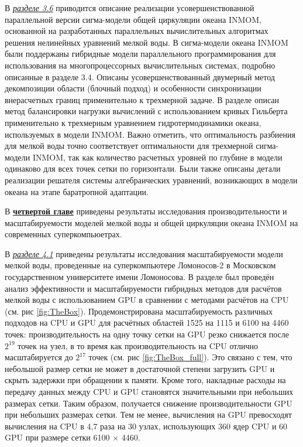 В \underline{\textit{разделе 3.6}} приводится описание реализации усовершенствованной параллельной версии сигма-модели общей циркуляции океана INMOM, основанной на разработанных параллельных вычислительных алгоритмах решения нелинейных уравнений мелкой воды.
В сигма-модели океана INMOM были поддержаны гибридные модели параллельного программирования для использования на многопроцессорных вычислительных системах, подробно описанные в разделе 3.4.
Описаны усовершенствованный двумерный метод декомпозиции области (блочный подход) и особенности синхронизации внерасчетных границ применительно к трехмерной задаче.
В разделе описан метод баланси­ровки нагрузки вычислений с использованием кривых Гильберта применительно к трехмерным уравнением гидротермодинамики океана, используемых в модели INMOM.
Важно отметить, что оптимальность разбиения для мелкой воды точно соответствует оптимальности для трехмерной сигма-модели INMOM, так как количество расчетных уровней по глубине в модели одинаково для всех точек сетки по горизонтали.
Были также описаны детали реализации решателя системы алгебраических уравнений, возникающих в модели океана на этапе баратропной адаптации.

В \underline{\textbf{четвертой главе}} приведены результаты исследования производительности и масштабируемости моделей мелкой воды и общей циркуляции океана INMOM на современных суперкомпьюетрах.

В \underline{\textit{разделе 4.1}} приведены результаты исследования масштабируемости модели мелкой воды, проведенные на суперкомпьютере Ломоносов-2 в Мос­ковском государственном университете имени Ломоносова.
В разделе был проведён анализ эффективности и масштабируемости гибридных методов для расчётов мелкой воды с использованием GPU в сравнении с методами расчётов на CPU (см. рис \ref{fig:TheBox}). 
Продемонстрирована масштабируемость различных подходов на CPU и GPU для расчётных областей 1525 на 1115 и 6100 на 4460 точек: производительность на одну точку сетки на GPU резко снижается после $2^{19}$ точек на узел, в то время как производительность на CPU отлично масштабируется до $2^{17}$ точек (см. рис \ref{fig:TheBox_full}). Это связано с тем, что небольшой размер сетки не может в достаточной степени загрузить GPU и скрыть задержки при обращении к памяти. Кроме того, накладные расходы на передачу данных между CPU и GPU становятся значительными при небольших размерах сетки. Таким образом, получается снижение производительности GPU при небольших размерах сетки.  Тем не менее, вычисления на GPU превосходят вычисления на CPU в 4,7 раза на 30 узлах, использующих 360 ядер CPU и 60 GPU при размере сетки 6100 $\times$ 4460.  

